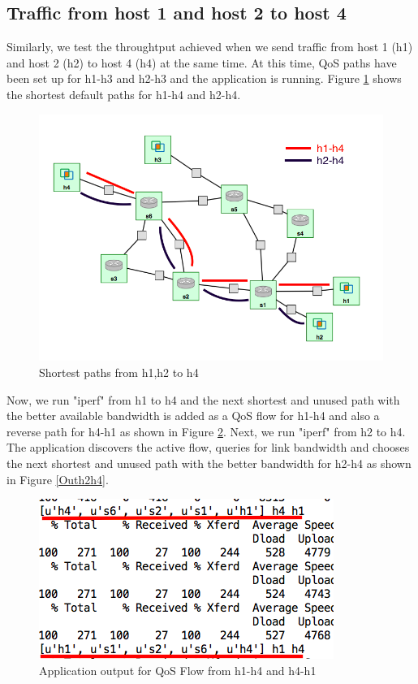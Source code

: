 \documentclass[paper=a4, fontsize=12pt]{scrartcl}	%
\numberwithin{equation}{section}		%
\numberwithin{figure}{section}			%
\numberwithin{table}{section}				%
\begin{document}
\subsection{Traffic from host 1 and host 2 to host 4}
Similarly, we test the throughtput achieved when we send traffic from host 1 (h1) and host 2 (h2) to host 4 (h4) at the same time. At this time, QoS paths have been set up for h1-h3 and h2-h3 and the application is running. Figure \ref{Shorth4} shows the shortest default paths for h1-h4 and h2-h4.
\begin{figure}[H]
\begin{center}
\includegraphics[scale=0.45]{shortesth4.png}   
\end{center}
 \caption{Shortest paths from h1,h2 to h4}
 \label{Shorth4}
\end{figure}
Now, we run "iperf" from h1 to h4 and the next shortest and unused path with the better available bandwidth is added as a QoS flow for h1-h4 and also a reverse path for h4-h1 as shown in Figure \ref{Outh1h4}. Next, we run "iperf"  from h2 to h4. The application discovers the active flow, queries for link bandwidth and chooses the next shortest and unused path with the better bandwidth for h2-h4 as shown in Figure \ref{Outh2h4}.

\begin{figure}[H]
\begin{center}
\includegraphics[scale=0.45]{h1-h4.png}   
\end{center}
 \caption{Application output for QoS Flow from h1-h4 and h4-h1}
 \label{Outh1h4}
\end{figure}
\end{document}

